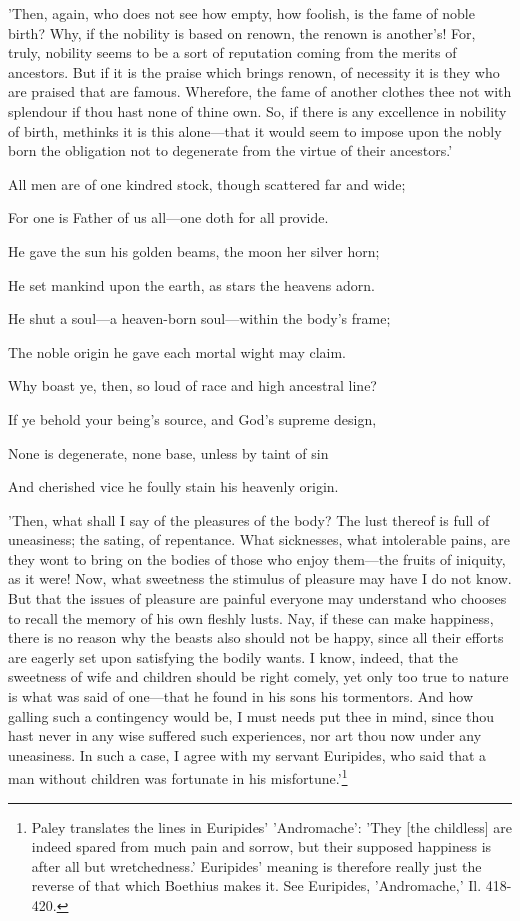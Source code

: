 'Then, again, who does not see how empty, how foolish, is the fame of
noble birth? Why, if the nobility is based on renown, the renown is
another's! For, truly, nobility seems to be a sort of reputation coming
from the merits of ancestors. But if it is the praise which brings
renown, of necessity it is they who are praised that are famous.
Wherefore, the fame of another clothes thee not with splendour if thou
hast none of thine own. So, if there is any excellence in nobility of
birth, methinks it is this alone—that it would seem to impose upon the
nobly born the obligation not to degenerate from the virtue of their
ancestors.'


All men are of one kindred stock, though scattered far and wide;

For one is Father of us all—one doth for all provide.

He gave the sun his golden beams, the moon her silver horn;

He set mankind upon the earth, as stars the heavens adorn.

He shut a soul—a heaven-born soul—within the body's frame;

The noble origin he gave each mortal wight may claim.

Why boast ye, then, so loud of race and high ancestral line?

If ye behold your being's source, and God's supreme design,

None is degenerate, none base, unless by taint of sin

And cherished vice he foully stain his heavenly origin.


'Then, what shall I say of the pleasures of the body? The lust thereof
is full of uneasiness; the sating, of repentance. What sicknesses, what
intolerable pains, are they wont to bring on the bodies of those who
enjoy them—the fruits of iniquity, as it were! Now, what sweetness the
stimulus of pleasure may have I do not know. But that the issues of
pleasure are painful everyone may understand who chooses to recall the
memory of his own fleshly lusts. Nay, if these can make happiness, there
is no reason why the beasts also should not be happy, since all their
efforts are eagerly set upon satisfying the bodily wants. I know,
indeed, that the sweetness of wife and children should be right comely,
yet only too true to nature is what was said of one—that he found in
his sons his tormentors. And how galling such a contingency would be, I
must needs put thee in mind, since thou hast never in any wise suffered
such experiences, nor art thou now under any uneasiness. In such a case,
I agree with my servant Euripides, who said that a man without children
was fortunate in his misfortune.'\footnote{Paley translates the lines in Euripides' 'Andromache':
'They [the childless] are indeed spared from much pain and sorrow, but
their supposed happiness is after all but wretchedness.' Euripides'
meaning is therefore really just the reverse of that which Boethius
makes it. See Euripides, 'Andromache,' Il. 418-420.}

